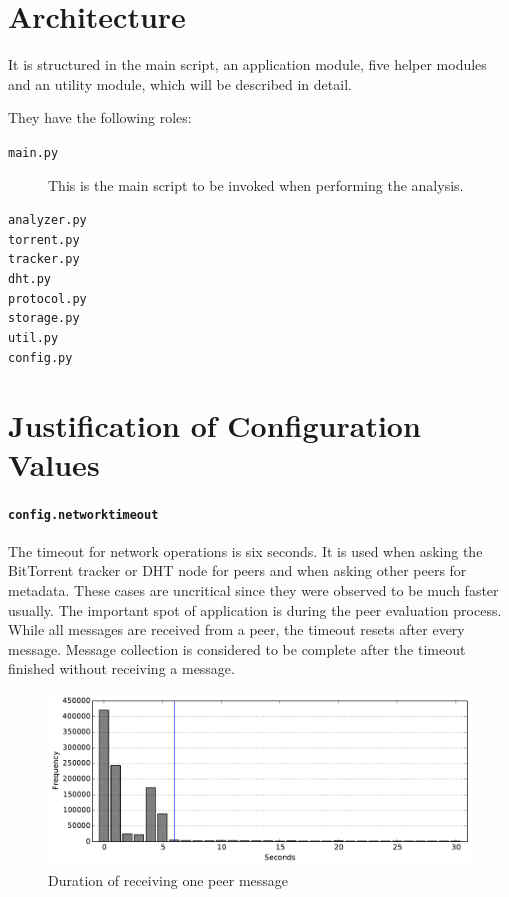 \documentclass[10pt, a4paper, twoside, headsepline]{scrbook}
\renewcommand{\_}{\origunderscore\allowbreak}
\newcommand{\config}[1]{\texttt{config.\allowbreak #1}}
\begin{document}
\section{Architecture}
It is structured in the main script, an application module, five helper modules and an utility module, which will be described in detail.

They have the following roles:

\begin{description}
  \item[\texttt{main.py}] This is the main script to be invoked when performing the analysis.
  \item[\texttt{analyzer.py}]
  \item[\texttt{torrent.py}]
  \item[\texttt{tracker.py}]
  \item[\texttt{dht.py}]
  \item[\texttt{protocol.py}]
  \item[\texttt{storage.py}]
  \item[\texttt{util.py}]
  \item[\texttt{config.py}]
\end{description}

\section{Justification of Configuration Values}
\paragraph{\config{network\_timeout}}
The timeout for network operations is six seconds. It is used when asking the BitTorrent tracker or DHT node for peers and when asking other peers for metadata. These cases are uncritical since they were observed to be much faster usually. The important spot of application is during the peer evaluation process. While all messages are received from a peer, the timeout resets after every message. Message collection is considered to be complete after the timeout finished without receiving a message.

\begin{figure}
\centering
\includegraphics[width=\textwidth]{graphics/2015-08-14_17-46-44_faui1-246_timeout}
\caption{Duration of receiving one peer message}
\label{timeout-calibration}
\end{figure}
\end{document}
